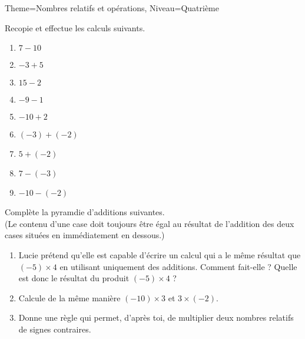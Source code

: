 \documentclass[11pt]{article}
\begin{document}
\begin{Maquette}[Fiche]{Theme=Nombres relatifs et opérations, Niveau=Quatrième}

    \begin{multicols}{2}
        \begin{exercice}
            Recopie et effectue les calculs suivants.
            \begin{enumerate}
                \item $7-10$
                \item $-3+5$
                \item $15-2$
                \item $-9-1$
                \item $-10+2$
                \item $(-3)+(-2)$
                \item $5+(-2)$
                \item $7-(-3)$
                \item $-10-(-2)$
            \end{enumerate}
        \end{exercice}

        \begin{exercice}
            Complète la pyramdie d’additions suivantes.\\
            (Le contenu d’une case doit toujours être égal au résultat de l’addition des deux cases situées en immédiatement en dessous.)
            \begin{center}

            \end{center}
        \end{exercice}

        \begin{exercice}
            \begin{enumerate}
                \item Lucie prétend qu’elle est capable d’écrire un calcul qui a le même résultat que $(-5)\times 4$ en utilisant uniquement des additions. Comment fait-elle ? Quelle est donc le résultat du produit $(-5) \times 4$ ?
                \item Calcule de la même manière $(-10) \times 3$ et $3 \times (-2)$.
                \item Donne une règle qui permet, d’après toi, de multiplier deux nombres relatifs de signes contraires.
            \end{enumerate}
        \end{exercice}


\end{multicols}
\end{Maquette}
\end{document}
